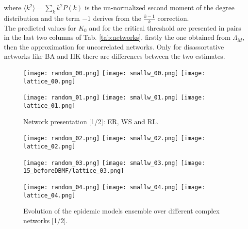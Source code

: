 \documentclass[DIV=12, BCOR=0pt]{scrartcl}  %
\begin{document}
  where $\langle k^2 \rangle = \sum_k k^2 P(k)$ is the un-normalized second moment of the degree distribution and the term $- 1$ derives from the $\frac{k-1}{k}$ correction.\\
  
  The predicted values for $K_0$ and for the critical threshold are presented in pairs in the last two columns of Tab. \ref{tab:networks}, firstly the one obtained from $\Lambda_M$, then the approximation for uncorrelated networks. Only for disassortative networks like BA and HK there are differences between the two estimates. 
 	
  

  \clearpage
  \begin{figure}[h!]
  	\centering
  	\texttt{[image: random\_00.png]}
  	\texttt{[image: smallw\_00.png]}
  	\texttt{[image: lattice\_00.png]}
  	
  	\texttt{[image: random\_01.png]}
  	\texttt{[image: smallw\_01.png]}
  	\texttt{[image: lattice\_01.png]}
  	\caption{Network presentation [1/2]: ER, WS and RL.}
  	\label{fig:networks0}
  \end{figure}  	
  
  \begin{figure}[h!]
  	\centering
  	\texttt{[image: random\_02.png]}
  	\texttt{[image: smallw\_02.png]}
  	\texttt{[image: lattice\_02.png]}
  	
  	\texttt{[image: random\_03.png]}
  	\texttt{[image: smallw\_03.png]}
  	\texttt{[image: 15\_beforeDBMF/lattice\_03.png]}
  	
  	\texttt{[image: random\_04.png]}
  	\texttt{[image: smallw\_04.png]}
  	\texttt{[image: lattice\_04.png]}
  	
  	\caption{Evolution of the epidemic models ensemble over different complex networks [1/2].}
  	\label{fig:outcomes0}
  \end{figure}
  \clearpage

  
\end{document}
